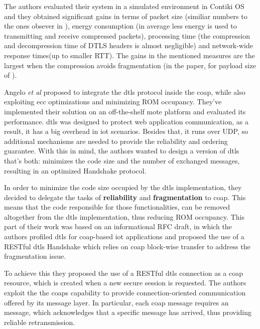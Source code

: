 \documentclass{llncs}
\begin{document}
The authors evaluated their system in a simulated environment in Contiki OS and
they obtained significant gains in terms of packet size (similiar numbers to the
ones obsever in \cite{6LoWPANC53:online}), energy consumption (in average  less
energy is used to transmitting and receive compressed packets), processing time
(the compression and decompression time of DTLS headers is almost negligible)
and network-wide response times(up to  smaller RTT). The
gains in the mentioned measures are the largest when the compression avoids
fragmentation (in the paper, for payload size of ).

Angelo \textit{et al} \cite{Security5:online} proposed to integrate the \gls{dtls} protocol
inside the \gls{coap}, while also exploiting \gls{ecc} optimizations and minimizing
ROM occupancy. They've implemented their solution on an off-the-shelf mote platform
and evaluated its performance. \gls{dtls} was designed to protect web application communication, as a result,
it has a big overhead in \gls{iot} scenarios. Besides that, it runs over UDP,
so additional mechanisms are needed to provide the reliability and ordering
guarantee. With this in mind, the authors wanted to design a version of \gls{dtls}
that's both: minimizes the code size and the number of exchanged messages, resulting
in an optimized Handshake protocol.

In order to minimize the code size occupied by the \gls{dtls} implementation, they
decided to delegate the tasks of \textbf{reliability} and \textbf{fragmentation} to
\gls{coap}. This means that the code responsible for those functionalities,
can be removed altogether from the \gls{dtls} implementation, thus reducing ROM
occupancy. This part of their work was based on an informational RFC draft\cite{I-D.keoh-dtls-profile-iot}, in which the
authors profiled \gls{dtls} for \gls{coap}-based \gls{iot} applications and proposed
the use of a RESTful \gls{dtls} Handshake which relies on \gls{coap} block-wise
transfer to address the fragmentation issue.

To achieve this they  proposed the use of a RESTful \gls{dtls} connection as a \gls{coap} resource,
which is created when a new secure session is requested.
The authors exploit the the \gls{coap}s capability to provide connection-oriented
communication offered by its message layer. In particular, each 
\gls{coap} message requires an  message\cite{RFC7252T66:online},
which acknowledges that a specific  message has arrived, thus
providing reliable retransmission.
\end{document}

